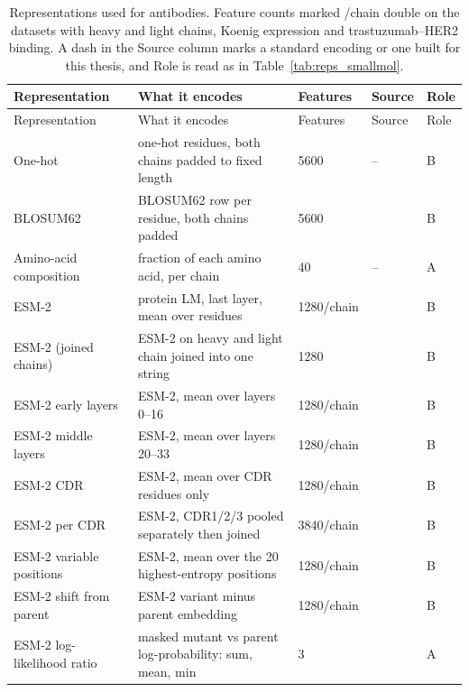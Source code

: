 {\let\small\footnotesize
\begin{longtable}{P{2.8cm}P{4.6cm}P{2.0cm}P{1.5cm}P{1.4cm}}
\caption[Representations used for antibodies.]{Representations used for antibodies. Feature counts marked /chain double on the datasets with heavy and light chains, Koenig expression and trastuzumab--HER2 binding. A dash in the Source column marks a standard encoding or one built for this thesis, and Role is read as in Table~\ref{tab:reps_smallmol}.}\label{tab:reps_antibodies}\\
\toprule
Representation & What it encodes & Features & Source & Role \\
\midrule
\endfirsthead
\toprule
Representation & What it encodes & Features & Source & Role \\
\midrule
\endhead
\bottomrule
\endfoot
One-hot & one-hot residues, both chains padded to fixed length & 5600 & -- & B \\
BLOSUM62 & BLOSUM62 row per residue, both chains padded & 5600 & \citep{Henikoff1992} & B \\
Amino-acid composition & fraction of each amino acid, per chain & 40 & -- & A \\
ESM-2 & protein LM, last layer, mean over residues & 1280/chain & \citep{Lin2023} & B \\
ESM-2 (joined chains) & ESM-2 on heavy and light chain joined into one string & 1280 & \citep{Lin2023} & B \\
ESM-2 early layers & ESM-2, mean over layers 0--16 & 1280/chain & \citep{Lin2023} & B \\
ESM-2 middle layers & ESM-2, mean over layers 20--33 & 1280/chain & \citep{Lin2023} & B \\
ESM-2 CDR & ESM-2, mean over CDR residues only & 1280/chain & \citep{Lin2023} & B \\
ESM-2 per CDR & ESM-2, CDR1/2/3 pooled separately then joined & 3840/chain & \citep{Lin2023} & B \\
ESM-2 variable positions & ESM-2, mean over the 20 highest-entropy positions & 1280/chain & \citep{Lin2023} & B \\
ESM-2 shift from parent & ESM-2 variant minus parent embedding & 1280/chain & \citep{Lin2023} & B \\
ESM-2 log-likelihood ratio & masked mutant vs parent log-probability: sum, mean, min & 3 & \citep{Meier2021} & A \\

\end{longtable}}

